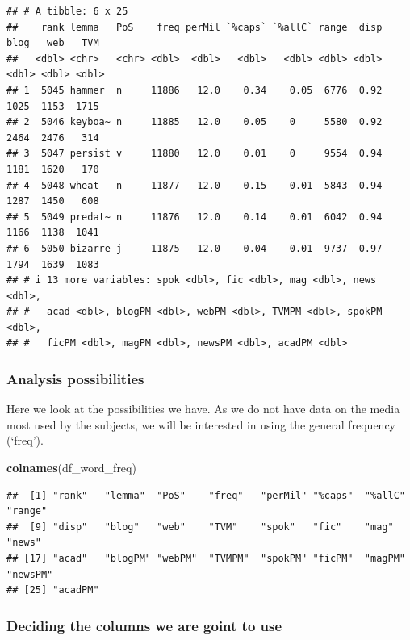 \documentclass[
]{article}
\newenvironment{Shaded}{\begin{snugshade}}{\end{snugshade}}
\newcommand{\FunctionTok}[1]{\textcolor[rgb]{0.13,0.29,0.53}{\textbf{#1}}}
\newcommand{\NormalTok}[1]{#1}
\begin{document}
\begin{verbatim}
## # A tibble: 6 x 25
##    rank lemma   PoS    freq perMil `%caps` `%allC` range  disp  blog   web   TVM
##   <dbl> <chr>   <chr> <dbl>  <dbl>   <dbl>   <dbl> <dbl> <dbl> <dbl> <dbl> <dbl>
## 1  5045 hammer  n     11886   12.0    0.34    0.05  6776  0.92  1025  1153  1715
## 2  5046 keyboa~ n     11885   12.0    0.05    0     5580  0.92  2464  2476   314
## 3  5047 persist v     11880   12.0    0.01    0     9554  0.94  1181  1620   170
## 4  5048 wheat   n     11877   12.0    0.15    0.01  5843  0.94  1287  1450   608
## 5  5049 predat~ n     11876   12.0    0.14    0.01  6042  0.94  1166  1138  1041
## 6  5050 bizarre j     11875   12.0    0.04    0.01  9737  0.97  1794  1639  1083
## # i 13 more variables: spok <dbl>, fic <dbl>, mag <dbl>, news <dbl>,
## #   acad <dbl>, blogPM <dbl>, webPM <dbl>, TVMPM <dbl>, spokPM <dbl>,
## #   ficPM <dbl>, magPM <dbl>, newsPM <dbl>, acadPM <dbl>
\end{verbatim}

\hypertarget{analysis-possibilities}{%
\subsubsection{Analysis possibilities}\label{analysis-possibilities}}

Here we look at the possibilities we have. As we do not have data on the
media most used by the subjects, we will be interested in using the
general frequency (`freq').

\begin{Shaded}
\begin{Highlighting}[]
\FunctionTok{colnames}\NormalTok{(df\_word\_freq)}
\end{Highlighting}
\end{Shaded}

\begin{verbatim}
##  [1] "rank"   "lemma"  "PoS"    "freq"   "perMil" "%caps"  "%allC"  "range" 
##  [9] "disp"   "blog"   "web"    "TVM"    "spok"   "fic"    "mag"    "news"  
## [17] "acad"   "blogPM" "webPM"  "TVMPM"  "spokPM" "ficPM"  "magPM"  "newsPM"
## [25] "acadPM"
\end{verbatim}

\hypertarget{deciding-the-columns-we-are-goint-to-use}{%
\subsubsection{Deciding the columns we are goint to
use}\label{deciding-the-columns-we-are-goint-to-use}}
\end{document}
